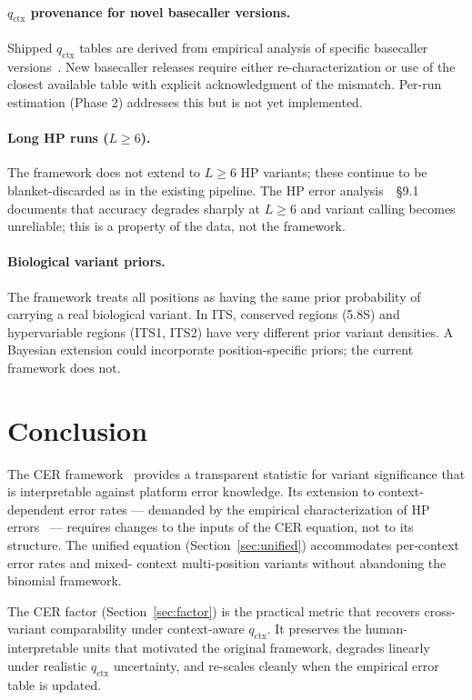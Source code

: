 \documentclass[11pt]{article}
\begin{document}
\paragraph{$q_\text{ctx}$ provenance for novel basecaller versions.} Shipped
$q_\text{ctx}$ tables are derived from empirical analysis of specific
basecaller versions~\cite{hp_paper}. New basecaller releases require either
re-characterization or use of the closest available table with explicit
acknowledgment of the mismatch. Per-run estimation (Phase 2) addresses this
but is not yet implemented.

\paragraph{Long HP runs ($L \geq 6$).} The framework does not extend to
$L \geq 6$ HP variants; these continue to be blanket-discarded as in the
existing pipeline. The HP error analysis~\cite{hp_paper}~\S 9.1 documents that
accuracy degrades sharply at $L \geq 6$ and variant calling becomes
unreliable; this is a property of the data, not the framework.

\paragraph{Biological variant priors.} The framework treats all positions as
having the same prior probability of carrying a real biological variant. In
ITS, conserved regions (5.8S) and hypervariable regions (ITS1, ITS2) have
very different prior variant densities. A Bayesian extension could incorporate
position-specific priors; the current framework does not.

\section{Conclusion}

The CER framework~\cite{cer_paper} provides a transparent statistic for variant
significance that is interpretable against platform error knowledge. Its
extension to context-dependent error rates --- demanded by the empirical
characterization of HP errors~\cite{hp_paper} --- requires changes to the
inputs of the CER equation, not to its structure. The unified equation
(Section~\ref{sec:unified}) accommodates per-context error rates and mixed-
context multi-position variants without abandoning the binomial framework.

The CER factor (Section~\ref{sec:factor}) is the practical metric that recovers
cross-variant comparability under context-aware $q_\text{ctx}$. It preserves
the human-interpretable units that motivated the original framework, degrades
linearly under realistic $q_\text{ctx}$ uncertainty, and re-scales cleanly
when the empirical error table is updated.
\end{document}
